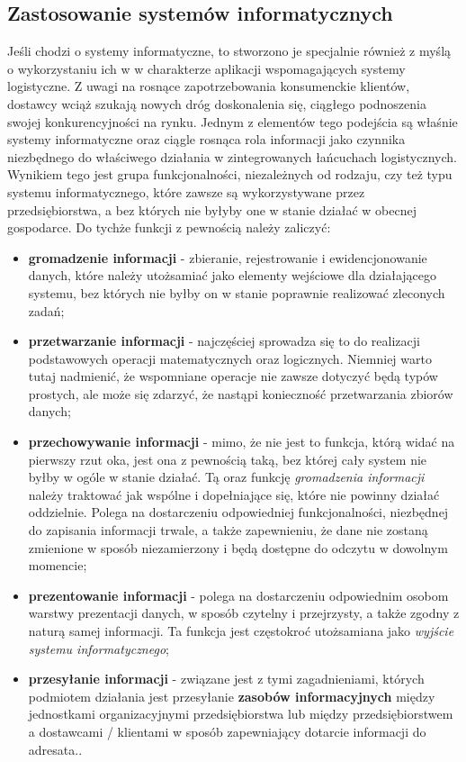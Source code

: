 	\subsection{Zastosowanie systemów informatycznych}
		Jeśli chodzi o systemy informatyczne, to stworzono je specjalnie również z myślą o wykorzystaniu ich w 
		w charakterze aplikacji wspomagających systemy logistyczne. Z uwagi na rosnące zapotrzebowania
		konsumenckie klientów, dostawcy wciąż szukają nowych dróg doskonalenia się, ciągłego podnoszenia
		swojej konkurencyjności na rynku. Jednym z elementów tego podejścia są właśnie systemy informatyczne 
		oraz ciągle rosnąca rola informacji jako czynnika niezbędnego do właściwego działania w 
		zintegrowanych łańcuchach logistycznych. Wynikiem tego jest grupa funkcjonalności, niezależnych od
		rodzaju, czy też typu systemu informatycznego, które zawsze są wykorzystywane przez przedsiębiorstwa,
		a bez których nie byłyby one w stanie działać w obecnej gospodarce.	
		Do tychże funkcji z pewnością należy zaliczyć:
		\begin{itemize}
			\item \textbf{gromadzenie informacji} - 
				zbieranie, rejestrowanie i ewidencjonowanie danych, które należy utożsamiać jako elementy wejściowe
				dla działającego systemu, bez których nie byłby on w stanie poprawnie realizować zleconych zadań;
			\item \textbf{przetwarzanie informacji} - 
				najczęściej sprowadza się to do realizacji podstawowych operacji
				matematycznych oraz logicznych. Niemniej warto tutaj nadmienić, że wspomniane operacje nie zawsze dotyczyć będą
				typów prostych, ale może się zdarzyć, że nastąpi konieczność przetwarzania zbiorów danych;
			\item \textbf{przechowywanie informacji} - 
				mimo, że nie jest to funkcja, którą widać na pierwszy rzut oka, jest ona z pewnością taką, bez której cały
				system nie byłby w ogóle w stanie działać. Tą oraz funkcję \emph{gromadzenia informacji} należy traktować jak wspólne
				i dopełniające się, które nie powinny działać oddzielnie. Polega na dostarczeniu odpowiedniej funkcjonalności, 
				niezbędnej do zapisania informacji trwale, a także zapewnieniu, że dane nie zostaną zmienione w sposób
				niezamierzony i będą dostępne do odczytu w dowolnym momencie;
			\item \textbf{prezentowanie informacji} - 
				polega na dostarczeniu odpowiednim osobom warstwy prezentacji danych, w sposób czytelny i przejrzysty, a także zgodny
				z naturą samej informacji. Ta funkcja jest częstokroć utożsamiana jako \emph{wyjście systemu informatycznego};
			\item \textbf{przesyłanie informacji} - 
				związane jest z tymi zagadnieniami, których podmiotem działania jest przesyłanie \textbf{zasobów informacyjnych}
				między jednostkami organizacyjnymi przedsiębiorstwa lub między przedsiębiorstwem a dostawcami / klientami w sposób
				zapewniający dotarcie informacji do adresata.\cite{logistyka_w_przedsiebiorstwie}.
		\end{itemize}
